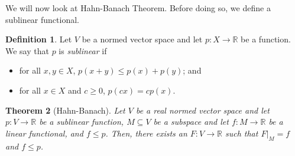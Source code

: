 \documentclass[a4paper, openany]{memoir}
\theoremstyle{definition}
\newtheorem{definition}{Definition}[section]
\theoremstyle{plain}
\newtheorem{theorem}[definition]{Theorem}
\begin{document}
    We will now look at Hahn-Banach Theorem. Before doing so, we define a sublinear functional.
    \begin{definition}
        Let $V$ be a normed vector space and let $p \colon X \to \mathbb{R}$ be a function. We say that $p$ is \emph{sublinear} if 
        \begin{itemize}
            \item for all $x, y \in X$, $p(x + y) \leq p(x) + p(y)$; and 
            \item for all $x \in X$ and $c \geq 0$, $p(cx) = cp(x)$.
        \end{itemize}
    \end{definition}
    \begin{theorem}[Hahn-Banach]
        Let $V$ be a real normed vector space and let $p \colon V \to \mathbb{R}$ be a sublinear function, $M \subseteq V$ be a subspace and let $f \colon M \to \mathbb{R}$ be a linear functional, and $f \leq p$. Then, there exists an $F \colon V \to \mathbb{R}$ such that $F|_M = f$ and $f \leq p$.
    \end{theorem}
\end{document}
